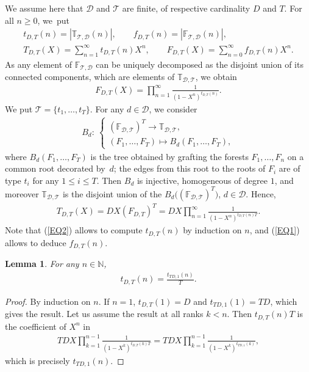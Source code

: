 \documentclass[pdftex]{sigma}
\numberwithin{equation}{section}
\newtheorem{Lemma}[Theorem]{Lemma}
\newcommand{\T}{\mathcal{T}}
\newcommand{\D}{\mathcal{D}}
\newcommand{\N}{\mathbb{N}}
\newcommand{\bfT}{\mathbb{T}}
\newcommand{\bfF}{\mathbb{F}}
\begin{document}
We assume here that $\D$ and $\T$ are finite, of respective cardinality $D$ and $T$. For all $n\geq 0$, we~put
\begin{gather*}
t_{D,T}(n)=|\bfT_{\T,\D}(n)|,\qquad f_{D,T}(n)=|\bfF_{\T,\D}(n)|,
\\
T_{D,T}(X)=\sum_{n=1}^\infty t_{D,T}(n)X^n,\qquad F_{D,T}(X)=\sum_{n=0}^\infty f_{D,T}(n)X^n.
\end{gather*}
As any element of $\bfF_{\T,\D}$ can be uniquely decomposed as the disjoint union of its connected components, which are
elements of $\bfT_{\D,\T}$, we obtain
\begin{gather}
\label{EQ1}
F_{D,T}(X)=\prod_{n=1}^\infty \frac{1}{(1-X^n)^{t_{D,T}(n)}}.
\end{gather}
We put $\T=\{t_1,\dots,t_T\}$. For any $d\in \D$, we consider
\begin{gather*}
B_d\colon\ \begin{cases}
(\bfF_{\D,\T})^T\longrightarrow \bfT_{\D,\T},
\\
(F_1,\dots,F_T)\longmapsto B_d(F_1,\dots,F_T),
\end{cases}
\end{gather*}
where $B_d(F_1,\dots,F_T)$ is the tree obtained by grafting the forests $F_1,\dots,F_n$
on a common root decorated by~$d$;
the edges from this root to the roots of $F_i$ are of type $t_i$ for any $1\leq i\leq T$.
Then $B_d$ is injective, homogeneous of degree $1$, and moreover $\bfT_{\D,\T}$
is the disjoint union of the $B_d\big((\bfF_{\D,\T})^T\big)$, $d\in \D$. Hence,
\begin{gather}
\label{EQ2} T_{D,T}(X)=DX (F_{D,T})^T=DX\prod_{n=1}^\infty\frac{1}{(1-X^n)^{t_{D,T}(n)T}}.
\end{gather}
Note that (\ref{EQ2}) allows to compute $t_{D,T}(n)$ by induction on $n$,
and (\ref{EQ1}) allows to deduce $f_{D,T}(n)$.

\begin{Lemma}
For any $n\in \N$,
\begin{gather*}
t_{D,T}(n)=\frac{t_{TD,1}(n)}{T}.
\end{gather*}
\end{Lemma}

\begin{proof} By induction on $n$. If $n=1$, $t_{D,T}(1)=D$ and $t_{TD,1}(1)=TD$, which gives the result.
Let us assume the result at all ranks $k<n$.
Then $t_{D,T}(n)T$ is the coefficient of $X^n$ in
\begin{gather*}
TDX\prod_{k=1}^{n-1}\frac{1}{(1-X^k)^{t_{D,T}(k)T}}
=TDX\prod_{k=1}^{n-1}\frac{1}{(1-X^k)^{t_{TD,1}(k)}},
\end{gather*}
which is precisely $t_{TD,1}(n)$.
\end{proof}
\end{document}

